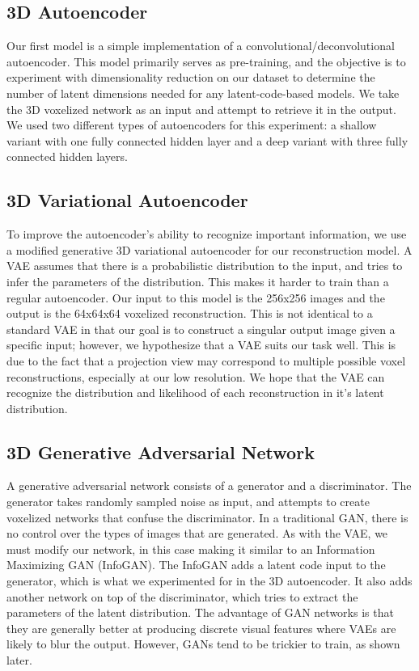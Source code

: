 \documentclass[conference, 10pt]{IEEEtran}
\begin{document}
\subsection{3D Autoencoder}
Our first model is a simple implementation of a convolutional/deconvolutional autoencoder. This model primarily serves as pre-training, and the objective is to experiment with dimensionality reduction on our dataset to determine the number of latent dimensions needed for any latent-code-based models. We take the 3D voxelized network as an input and attempt to retrieve it in the output. We used two different types of autoencoders for this experiment: a shallow variant with one fully connected hidden layer and a deep variant with three fully connected hidden layers. 

\subsection{3D Variational Autoencoder}
To improve the autoencoder’s ability to recognize important information, we use a modified generative 3D variational autoencoder for our reconstruction model. A VAE assumes that there is a probabilistic distribution to the input, and tries to infer the parameters of the distribution. This makes it harder to train than a regular autoencoder. Our input to this model is the 256x256 images and the output is the 64x64x64 voxelized reconstruction. This is not identical to a standard VAE in that our goal is to construct a singular output image given a specific input; however, we hypothesize that a VAE suits our task well. This is due to the fact that a projection view may correspond to multiple possible voxel reconstructions, especially at our low resolution. We hope that the VAE can recognize the distribution and likelihood of each reconstruction in it’s latent distribution.

\subsection{3D Generative Adversarial Network}

A generative adversarial network consists of a generator and a discriminator. The generator takes randomly sampled noise as input, and attempts to create voxelized networks that confuse the discriminator. In a traditional GAN, there is no control over the types of images that are generated. As with the VAE, we must modify our network, in this case making it similar to an Information Maximizing GAN (InfoGAN). The InfoGAN adds a latent code input to the generator, which is what we experimented for in the 3D autoencoder. It also adds another network on top of the discriminator, which tries to extract the parameters of the latent distribution. The advantage of GAN networks is that they are generally better at producing discrete visual features where VAEs are likely to blur the output. However, GANs tend to be trickier to train, as shown later.
\end{document}
